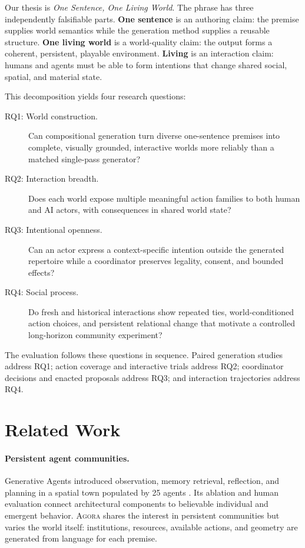 \documentclass[10pt,twocolumn]{article}
\newcommand{\agora}{\textsc{Agora}\xspace}
\newcommand{\systemvision}{\emph{One Sentence, One Living World}}
\begin{document}
Our thesis is \systemvision. The phrase has three independently falsifiable
parts. \textbf{One sentence} is an authoring claim: the premise supplies world
semantics while the generation method supplies a reusable structure.
\textbf{One living world} is a world-quality claim: the output forms a coherent,
persistent, playable environment. \textbf{Living} is an interaction claim:
humans and agents must be
able to form intentions that change shared social, spatial, and material state.

This decomposition yields four research questions:
\begin{description}
  \item[RQ1: World construction.] Can compositional generation turn diverse
  one-sentence premises into complete, visually grounded, interactive worlds
  more reliably than a matched single-pass generator?
  \item[RQ2: Interaction breadth.] Does each world expose multiple meaningful
  action families to both human and AI actors, with consequences in shared
  world state?
  \item[RQ3: Intentional openness.] Can an actor express a context-specific
  intention outside the generated repertoire while a coordinator preserves
  legality, consent, and bounded effects?
  \item[RQ4: Social process.] Do fresh and historical interactions show repeated
  ties, world-conditioned action choices, and persistent relational change that
  motivate a controlled long-horizon community experiment?
\end{description}

The evaluation follows these questions in sequence. Paired generation studies
address RQ1; action coverage and interactive trials address RQ2;
coordinator decisions and enacted proposals address RQ3; and interaction
trajectories address RQ4.

\section{Related Work}

\paragraph{Persistent agent communities.}
Generative Agents introduced observation, memory retrieval, reflection, and
planning in a spatial town populated by 25 agents \cite{park2023}. Its
ablation and human evaluation connect architectural components to believable
individual and emergent behavior. \agora shares the interest in persistent
communities but varies the world itself: institutions, resources, available
actions, and geometry are generated from language for each premise.
\end{document}
